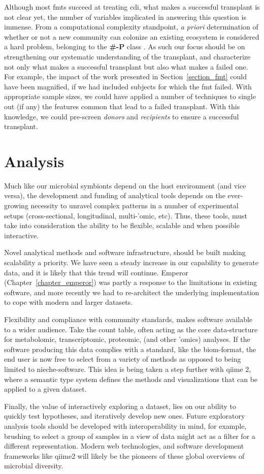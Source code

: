 Although most \glspl{fmt} succeed at treating \gls{cdi}, what makes a
successful transplant is not clear yet, the number of variables implicated in
answering this question is immense. From a computational complexity standpoint,
\textit{a priori} determination of whether or not a new community can colonize 
an existing ecosystem is considered a hard problem, belonging to the 
\textbf{\#-P} class \cite{RN4266}. As such our focus should be on strengthening 
our systematic understanding of the transplant, and characterize not only what 
makes a successful transplant but also what makes a failed one.  For example, 
the impact of the work presented in Section~\ref{section_fmt} could have been 
magnified, if we had included subjects for which the \gls{fmt} failed. With 
appropriate sample sizes, we could have applied a number of techniques to 
single out (if any) the features common that lead to a failed transplant. With 
this knowledge, we could pre-screen \textit{donors} and \textit{recipients} to 
ensure a successful transplant.

\section{Analysis}

Much like our microbial symbionts depend on the host environment (and vice
versa), the development and funding of analytical tools depends on the
ever-growing necessity to unravel complex patterns in a number of experimental
setups (cross-sectional, longitudinal, multi-'omic, etc). Thus, these tools,
must take into consideration the ability to be flexible, scalable and when
possible interactive.

Novel analytical methods and software infrastructure, should be built making 
scalability a priority.  We have seen a steady increase in our capability to 
generate data, and it is likely that this trend will continue. Emperor 
(Chapter~\ref{chapter_emperor}) was partly a response to the limitations in 
existing software, and more recently we had to re-architect the underlying 
implementation to cope with modern and larger datasets.

Flexibility and compliance with community standards, makes software available
to a wider audience. Take the count table, often acting as the core
data-structure for metabolomic, transcriptomic, proteomic, (and other 'omics)
analyses. If the software producing this data complies with a standard, like
the \gls{biom}-format, the end user is now free to select from a variety of
methods as opposed to being limited to nieche-software. This idea is being
taken a step further with \gls{qiime} 2, where a semantic type system defines
the methods and visualizations that can be applied to a given dataset.

Finally, the value of interactively exploring a dataset, lies on our ability to
quickly test hypotheses, and iteratively develop new ones. Future exploratory
analysis tools should be developed with interoperability in mind, for example,
brushing to select a group of samples in a view of data might act as a filter
for a different representation. Modern web technologies, and software
development frameworks like \gls{qiime}2 will likely be the pioneers of these
global overviews of microbial diversity.
